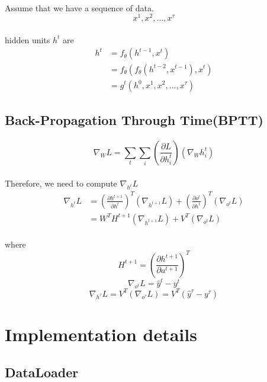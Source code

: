 \paragraph{}
Assume that we have a sequence of data.
$$x^1, x^2, \dots, x^\tau$$
\paragraph{}
hidden units $h^t$ are
\begin{equation}
\begin{aligned}
h^t &= f_\theta(h^{t-1}, x^t)\\ &= f_\theta(f_\theta(h^{t-2}, x^{t-1}), x^t) \\ 
&=g^t(h^0, x^1, x^2, \dots, x^\tau)
\end{aligned}
\end{equation}
\subsection{Back-Propagation Through Time(BPTT)}
\paragraph{}
$$\nabla_WL = \sum_t{\sum_i{(\frac{\partial L}{\partial h_i^{t}})(\nabla_Wh_i^t)}}$$
\paragraph{}
Therefore, we need to compute $\nabla_{h^t}L$
\begin{equation}
\begin{aligned}
\nabla_{h^t}L &= (\frac{\partial h^{t+1}}{\partial h^{t}})^T(\nabla_{h^{t+1}}L) + (\frac{\partial o^{t}}{\partial h^t})^T(\nabla_{o^t}L) \\ &= W^TH^{t+1}(\nabla_{h^{t+1}}L)+V^T(\nabla_{o^t}L)
\end{aligned}
\end{equation}
\paragraph{}
where 
$$H^{t+1} = (\frac{\partial h^{t+1}}{\partial a^{t+1}})^T$$
$$\nabla_{o^t}L = \hat{y}^t - y^t$$
$$\nabla_{h^{\tau}}L = V^T(\nabla_{o^\tau}L)=V^T(\hat{y}^\tau - y^\tau)$$

\section{Implementation details}
\subsection{DataLoader}
